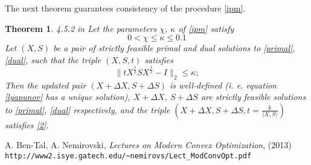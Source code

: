 \documentclass[12pt]{article}
\begin{document}
The next theorem guarantees consistency of the procedure \ref{ipm}.
\newtheorem{Th}{Theorem}
\begin{Th}{4.5.2 in \cite{nemirovski}}
	Let the parameters $\chi$, $\kappa$ of \ref{ipm} satisfy
	\[
		0 < \chi \leq \kappa \leq 0.1
	\]
	Let $(X, S)$ be a pair of strictly feasible primal and dual solutions to \ref{primal}, 
	\ref{dual}, such that the triple $(X, S, t)$ satisfies
	\begin{equation}
	\label{2}
		\| t X^{\frac12} S X^{\frac12} - I \|_2 \leq \kappa;
	\end{equation}
	Then the updated pair $(X + \Delta X, S + \Delta S)$ is well-defined (i. e. equation 
	\ref{lyapunov} has a unique solution), $X + \Delta X$, $S + \Delta S$ are strictly 
	feasible solutions to \ref{primal}, \ref{dual} respectively, and the triple $\left(X + 
	\Delta X, S + \Delta S, t = \frac k{ \langle X, S \rangle } \right)$ satisfies \ref{2}.
\end{Th}
	
\renewcommand{\refname}{References}
\begin{thebibliography}{0}
	A. Ben-Tal, A. Nemirovski, {\it Lectures on Modern Convex Optimization}, (2013)\\ 
	\verb'http://www2.isye.gatech.edu/~nemirovs/Lect_ModConvOpt.pdf'
\end{thebibliography}
\end{document}
